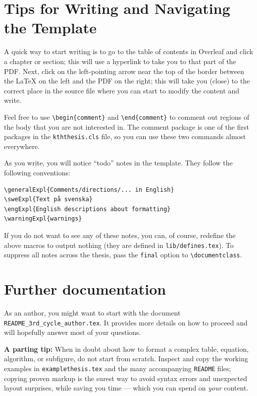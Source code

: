 \documentclass{article}
\newcommand{\fname}[1]{\texttt{#1}}
\begin{document}
\section*{Tips for Writing and Navigating the Template}
A quick way to start writing is to go to the table of contents in Overleaf and click a chapter or section; this will use a hyperlink to take you to that part of the PDF. Next, click on the left-pointing arrow near the top of the border between the \LaTeX{} on the left and the PDF on the right; this will take you (close) to the correct place in the source file where you can start to modify the content and write.

Feel free to use \texttt{\textbackslash begin\{comment\}} and \texttt{\textbackslash end\{comment\}} to comment out regions of the body that you are not interested in. The comment package is one of the first packages in the \fname{kththesis.cls} file, so you can use these two commands almost everywhere.

As you write, you will notice \enquote{todo} notes in the template. They follow the following conventions:
\begin{verbatim}
\generalExpl{Comments/directions/... in English}
\sweExpl{Text på svenska}
\engExpl{English descriptions about formatting}
\warningExpl{warnings}
\end{verbatim}

If you do not want to see any of these notes, you can, of course, redefine the above macros to output nothing (they are defined in \fname{lib/defines.tex}). To suppress all notes across the thesis, pass the \texttt{final} option to \texttt{\textbackslash documentclass}.

\section*{Further documentation}
As an author, you might want to start with the document \fname{README\_3rd\_cycle\_author.tex}. It provides more details on how to proceed and will hopefully answer most of your questions.
\medskip

\textbf{A parting tip:} When in doubt about how to format a complex table, equation, algorithm, or subfigure, do not start from scratch. Inspect and copy the working examples in \fname{examplethesis.tex} and the many accompanying \fname{README} files; copying proven markup is the surest way to avoid syntax errors and unexpected layout surprises, while saving you time --- which you can spend on \textit{your} content.
\end{document}
